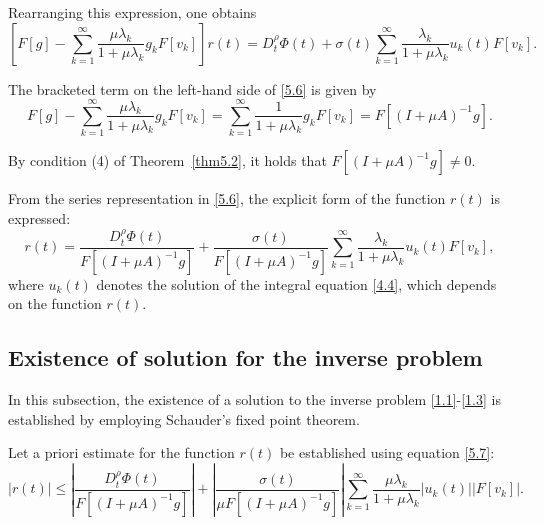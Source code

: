 \documentclass[reqno]{amsart}
\theoremstyle{definition}
\numberwithin{equation}{section}
\begin{document}
Rearranging this expression, one obtains
\begin{equation} \label{5.6}
\left[ F[g]-\sum\limits_{k=1}^{\infty }{\frac{\mu {{\lambda }_{k}}}{1+\mu {{\lambda }_{k}}}{{g}_{k}}F\left[ {{v}_{k}} \right]} \right]r(t)=D_{t}^{\rho }\Phi (t)+\sigma (t)\sum\limits_{k=1}^{\infty }{\frac{{{\lambda }_{k}}}{1+\mu {{\lambda }_{k}}}}{{u}_{k}}(t)F\left[ {{v}_{k}} \right].
\end{equation}

The bracketed term on the left-hand side of \eqref{5.6} is given by
$$
F[g]-\sum\limits_{k=1}^{\infty }{\frac{\mu {{\lambda }_{k}}}{1+\mu {{\lambda }_{k}}}{{g}_{k}}F\left[ {{v}_{k}} \right]}=\sum\limits_{k=1}^{\infty }{\frac{1}{1+\mu {{\lambda }_{k}}}{{g}_{k}}F\left[ {{v}_{k}} \right]}=F[{{(I+\mu A)}^{-1}}g].
$$

By condition (4) of Theorem~\ref{thm5.2}, it holds that $F[(I+\mu A)^{-1}g] \ne 0$.

From the series representation in \eqref{5.6}, the explicit form of the function $r(t)$ is expressed:
\begin{equation}\label{5.7}
r(t)=\frac{D_{t}^{\rho }\Phi(t)}{F[{{(I+\mu A)}^{-1}}g]}+\frac{\sigma (t)}{F[{{(I+\mu A)}^{-1}}g]}\sum\limits_{k=1}^{\infty }{\frac{{{\lambda }_{k}}}{1+\mu {{\lambda }_{k}}}{{u}_{k}}(t)F\left[ {{v}_{k}} \right]},
\end{equation}
where $u_k(t)$ denotes the solution of the integral equation \eqref{4.4}, which depends on the function $r(t)$. 

\subsection{Existence of solution for the inverse problem} In this subsection, the existence of a solution to the inverse problem \eqref{1.1}-\eqref{1.3} is established by employing Schauder's fixed point theorem.

Let a priori estimate for the function $r(t)$ be established using equation \eqref{5.7}:
$$
\left| r(t) \right| \leq \left| \frac{D_{t}^{\rho }\Phi (t)}{F[{{(I+\mu A)}^{-1}}g]} \right|+\left| \frac{\sigma (t)}{\mu F[{{(I+\mu A)}^{-1}}g]} \right|\sum\limits_{k=1}^{\infty }{\frac{\mu {{\lambda }_{k}}}{1+\mu {{\lambda }_{k}}}\left| {{u}_{k}}(t) \right|\left| F\left[ {{v}_{k}} \right] \right|}.
$$
\end{document}
